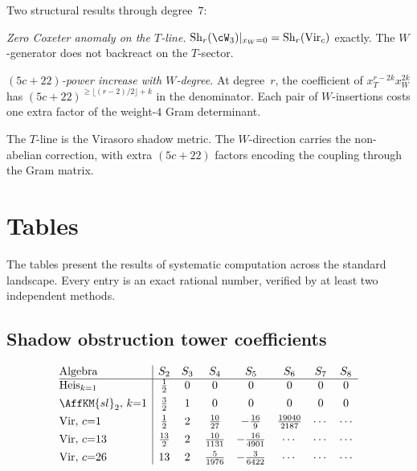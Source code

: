 Two structural results through degree~$7$:

\emph{Zero Coxeter anomaly on the $T$-line.}
$\mathrm{Sh}_r(\cW_3)|_{x_W=0} = \mathrm{Sh}_r(\mathrm{Vir}_c)$
exactly. The $W$-generator does not backreact on the $T$-sector.

\emph{$(5c{+}22)$-power increase with $W$-degree.}
At degree~$r$, the coefficient of $x_T^{r-2k} x_W^{2k}$ has
$(5c{+}22)^{\geq \lfloor(r-2)/2\rfloor + k}$ in the
denominator. Each pair of $W$-insertions costs one extra factor
of the weight-$4$ Gram determinant.

The $T$-line is the Virasoro shadow metric. The $W$-direction
carries the non-abelian correction, with extra $(5c{+}22)$
factors encoding the coupling through the Gram matrix.


\section{Tables}
\label{sec:comp-tables}

The tables present the results of systematic computation
across the standard landscape. Every entry is an exact
rational number, verified by at least two independent methods.


\subsection{Shadow obstruction tower coefficients}
\label{subsec:comp-shadow-table}

\begin{table}[htbp]
\centering
\caption{Shadow obstruction tower coefficients on the $T$-line.
Class~$G$: terminates at $S_2$. Class~$L$: at $S_3$.
Class~$M$: infinite.}
\label{tab:comp-shadow-towers}
\small
\[
\begin{array}{@{}l|cccccccc@{}}
 \text{Algebra}
 & S_2 & S_3 & S_4 & S_5 & S_6 & S_7 & S_8 \\
\hline
 \text{Heis}_{k=1}
 & \frac{1}{2} & 0 & 0 & 0 & 0 & 0 & 0 \\[4pt]
 \AffKM{sl}_2,\, k{=}1
 & \frac{3}{2} & 1 & 0 & 0 & 0 & 0 & 0 \\[4pt]
 \text{Vir},\, c{=}1
 & \frac{1}{2} & 2
 & \frac{10}{27} & -\frac{16}{9} & \frac{19040}{2187}
 & \cdots & \cdots \\[4pt]
 \text{Vir},\, c{=}13
 & \frac{13}{2} & 2
 & \frac{10}{1131} & -\frac{16}{4901}
 & \cdots & \cdots
 & \cdots \\[4pt]
 \text{Vir},\, c{=}26
 & 13 & 2
 & \frac{5}{1976} & -\frac{3}{6422}
 & \cdots & \cdots
 & \cdots
\end{array}
\]
\end{table}

